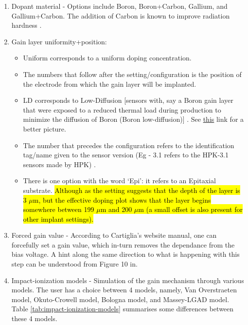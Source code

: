 \documentclass[11pt]{article}
\newcommand{\hlyellow}[1]{{\sethlcolor{yellow}\hl{#1}}}
\begin{document}
\begin{enumerate}
    \item Dopant material - Options include Boron, Boron+Carbon, Gallium, and Gallium+Carbon. The addition of Carbon is known to improve radiation hardness \cite{ferrero-radiation-hardness}.
    \item Gain layer uniformity+position: 
        \begin{itemize}
            \item Uniform corresponds to a uniform doping concentration. 
            \item The numbers that follow after the setting/configuration is the position of the electrode from which the gain layer will be implanted. 
            \item LD corresponds to Low-Diffusion [sensors with, say a Boron gain layer that were exposed to a reduced thermal load during production to minimize the diffusion of Boron (Boron low-diffusion)] \cite{ferrero-radiation-hardness}. See \href{https://indico.cern.ch/event/806731/contributions/3516709/attachments/1926118/3188326/191013-VERTEX-RD50-mmoll-acceptor-removal.pdf}{this} link for a better picture.
            \item The number that precedes the configuration refers to the identification tag/name given to the sensor version (Eg - 3.1 refers to the HPK-3.1 sensors made by HPK) \cite{jadhav-sensor-variation, jin-sensor-variation}.
            \item There is one option with the word `Epi': it refers to an Epitaxial substrate. \hlyellow{Although as the setting suggests that the depth of the layer is 3 $\mu$m, but the effective doping plot shows that the layer begins somewhere between 199 $\mu$m and 200 $\mu$m (a small offset is also present for other implant settings).}
        \end{itemize}
    \item Forced gain value - According to Cartiglia's website manual, one can forcefully set a gain value, which in-turn removes the dependance from the bias voltage. A hint along the same direction to what is happening with this step can be understood from Figure 10 in\cite{ferrero-radiation-hardness}.
    \item Impact-ionization models - Simulation of the gain mechanism through various models. The user has a choice between 4 models, namely, Van Overstraeten model, Okuto-Crowell model, Bologna model, and Massey-LGAD model. Table \ref{tab:impact-ionization-models} summarises some differences between these 4 models.
\end{enumerate}
\end{document}

